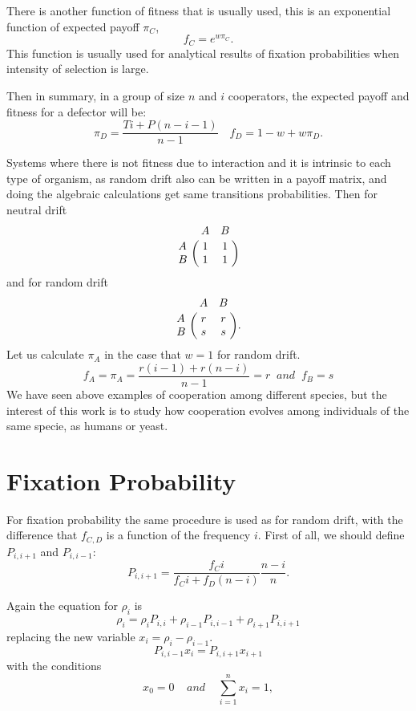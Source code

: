 There is another function of fitness that is usually used, this is an exponential function of expected payoff $\pi_{C}$,
\begin{equation}
f_{C}=e^{w\pi_{C}}.
\end{equation}
This function is usually used for analytical results of fixation probabilities when intensity of selection is large.

Then in summary, in a group of size $n$ and $i$ cooperators, the expected payoff and fitness for a defector will be:
\begin{equation}
\pi_{D}=\frac{Ti + P(n-i-1)}{n-1}\;\:\:\; f_{D}=1-w+w\pi_{D}.
\end{equation} 
 
Systems where there is not fitness due to interaction and it is intrinsic to each type of organism, as random drift also can be written in a payoff matrix, and doing the algebraic calculations get same transitions probabilities. Then for neutral drift
\begin{equation*}
\bordermatrix{~ & A & B \cr
             A & 1 & 1 \cr
              B & 1 & 1 \cr} 
\end{equation*}
 and for random drift
 \begin{equation*}
\bordermatrix{~ & A & B \cr
             A & r & r \cr
              B & s & s \cr}. 
\end{equation*}
Let us calculate $\pi_A$ in the case that $w=1$ for random drift.
\begin{equation*}
f_{A}=\pi_A=\frac{r(i-1)+r(n-i)}{n-1}=r\;\; and \;\; f_{B}=s
\end{equation*}
We have seen above examples of cooperation among different species, but the interest of this work is to study how cooperation evolves among individuals of the same specie, as humans or yeast. 

 
\section{Fixation Probability}
For fixation probability the same procedure is used  as for random drift, with the difference that $f_{C,D}$ is a function of the frequency $i$. First of all, we should define $P_{i,i+1}$ and $P_{i,i-1}$:
\begin{equation}
P_{i,i+1}=\frac{f_{C}i}{f_{C}i+f_{D}(n-i)}\frac{n-i}{n}.
\end{equation} 


Again the equation for $\rho_{i}$ is 
\begin{equation}\label{5.9}
\rho_{i}=\rho_{i}P_{i,i} + \rho_{i-1}P_{i,i-1} + \rho_{i+1}P_{i,i+1}
\end{equation}   
replacing the new variable $x_{i}=\rho_{i}-\rho_{i-1}$.
\begin{equation}
P_{i,i-1}x_{i}=P_{i,i+1}x_{i+1}
\end{equation}
with the conditions
\begin{equation}
 x_0 = 0\;\;\;\; and\;\;\;\; \sum_{i=1}^{n}x_i =1,
 \end{equation}
 
